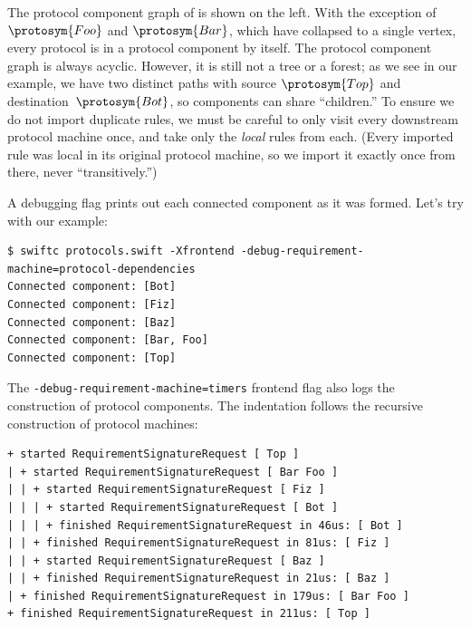 \documentclass[../generics]{subfiles}
\begin{document}
\begin{figure}
\end{figure}

The protocol component graph of  is shown on the left. With the exception of $\protosym{Foo}$ and $\protosym{Bar}$, which have collapsed to a single vertex, every protocol is in a protocol component by itself. The protocol component graph is always acyclic. However, it is still not a tree or a forest; as we see in our example, we have two distinct paths with source $\protosym{Top}$ and destination~$\protosym{Bot}$, so components can share ``children.'' To ensure we do not import duplicate rules, we must be careful to only visit every downstream protocol machine once, and take only the \emph{local} rules from each. (Every imported rule was local in its original protocol machine, so we import it exactly once from there, never ``transitively.'')

A debugging flag prints out each connected component as it was formed. Let's try with our example:
\begin{Verbatim}[fontsize=\footnotesize,numbers=none]
$ swiftc protocols.swift -Xfrontend -debug-requirement-machine=protocol-dependencies
Connected component: [Bot]
Connected component: [Fiz]
Connected component: [Baz]
Connected component: [Bar, Foo]
Connected component: [Top]
\end{Verbatim}

The
\texttt{-debug-requirement-machine=timers} frontend flag also logs the construction of protocol components. The indentation follows the recursive construction of protocol machines:
\begin{Verbatim}[fontsize=\footnotesize,numbers=none]
+ started RequirementSignatureRequest [ Top ]
| + started RequirementSignatureRequest [ Bar Foo ]
| | + started RequirementSignatureRequest [ Fiz ]
| | | + started RequirementSignatureRequest [ Bot ]
| | | + finished RequirementSignatureRequest in 46us: [ Bot ]
| | + finished RequirementSignatureRequest in 81us: [ Fiz ]
| | + started RequirementSignatureRequest [ Baz ]
| | + finished RequirementSignatureRequest in 21us: [ Baz ]
| + finished RequirementSignatureRequest in 179us: [ Bar Foo ]
+ finished RequirementSignatureRequest in 211us: [ Top ]
\end{Verbatim}
\end{document}
